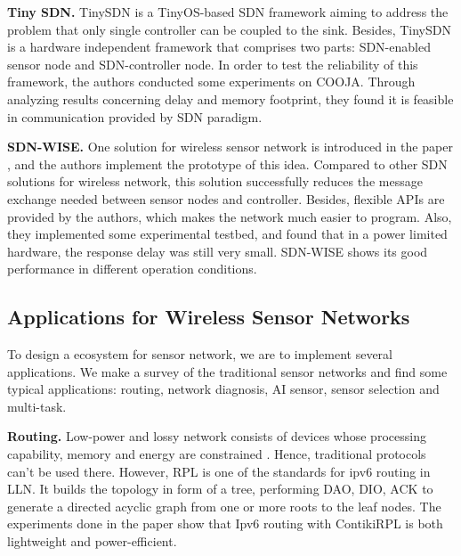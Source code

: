 \textbf{Tiny SDN.}
TinySDN \cite{de2015tinysdn} is a TinyOS-based SDN framework aiming to 
address the problem that only single controller can be coupled to the sink. 
Besides, TinySDN is a hardware independent framework that comprises two parts: 
SDN-enabled sensor node and SDN-controller node. 
In order to test the reliability of this framework, the authors conducted some experiments on COOJA. 
Through analyzing results concerning delay and memory 
footprint, they found it is feasible in communication provided by SDN paradigm.

\textbf{SDN-WISE.}
One solution for wireless sensor network is introduced in the paper \cite{galluccio2015sdn}, 
and the authors implement the prototype of this idea. Compared to other SDN solutions for wireless network, 
this solution successfully reduces the message exchange needed between sensor nodes and controller. 
Besides, flexible APIs are provided by the authors, which makes the network much easier to program. 
Also, they implemented some experimental testbed, and found that in a power limited hardware, the response delay was still very small. 
SDN-WISE shows its good performance in different operation conditions.


\subsection{Applications for Wireless Sensor Networks}

To design a ecosystem for sensor network, 
we are to implement several applications.  
We make a survey of the traditional sensor 
networks and find some typical applications: 
routing, network diagnosis, AI sensor, sensor selection and multi-task.

\textbf{Routing.}
Low-power and lossy network consists of devices whose processing capability, 
memory and energy are constrained \cite{Winter2012}. Hence, traditional 
protocols can’t be used there. However, RPL is one of the standards for ipv6 routing in LLN. 
It builds the topology in form of a tree, performing DAO, DIO, ACK to generate a directed acyclic graph 
from one or more roots to the leaf nodes. The experiments done in the paper \cite{Tsiftes2010a} show 
that Ipv6 routing with ContikiRPL is both lightweight and power-efficient.
 

